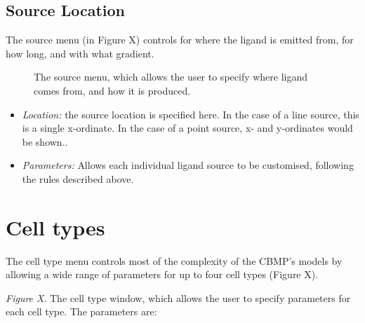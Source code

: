 \documentclass[11.5pt]{article}
\begin{document}


\subsection{Source Location}
The source menu (in Figure X) controls for where the ligand is emitted 
from, for how long, and with what gradient.

\begin{figure}[H]
\centering
\caption{The source menu, which allows the user to specify 
where ligand comes from, and how it is produced.}
\end{figure}



\begin{itemize}
\item {\itshape Location: }the source location is specified here. In the 
case of a line source, this is a single x-ordinate. In the case of a 
point source, x- and y-ordinates would be shown..
\item {\itshape Parameters: }Allows each individual ligand source to be 
customised, following the rules described above.
\setcounter{numberedCntB}{\theenumi}
\end{itemize}




\section{Cell types}

The cell type menu controls most of the complexity of the CBMP's models 
by allowing a wide range of parameters for up to four cell types (Figure 
X). 

\begin{figure}[H]
\centering
\end{figure}


{\itshape Figure X}. The cell type window, which allows the user to 
specify parameters for each cell type. The parameters are:
\end{document}
